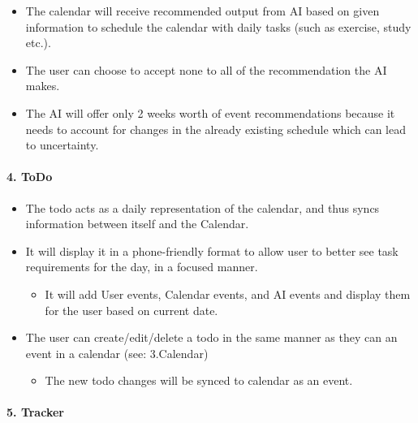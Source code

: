 \documentclass[a4paper,11pt]{article} %
\begin{document}
\begin{itemize}
  \begin{itemize}
   
  \item
    The calendar will receive recommended output from AI based on given
    information to schedule the calendar with daily tasks (such as
    exercise, study etc.).
  \item
    The user can choose to accept none to all of the recommendation the
    AI makes.
  \item
    The AI will offer only 2 weeks worth of event recommendations
    because it needs to account for changes in the already existing
    schedule which can lead to uncertainty.
  \end{itemize}
\end{itemize}

\hypertarget{todo}{%
\paragraph{4. ToDo}\label{todo}}

\begin{itemize}
 
\item
  The todo acts as a daily representation of the calendar, and thus
  syncs information between itself and the Calendar.
\item
  It will display it in a phone-friendly format to allow user to better
  see task requirements for the day, in a focused manner.

  \begin{itemize}
   
  \item
    It will add User events, Calendar events, and AI events and display
    them for the user based on current date.
  \end{itemize}
\item
  The user can create/edit/delete a todo in the same manner as they can
  an event in a calendar (see: 3.Calendar)

  \begin{itemize}
   
  \item
    The new todo changes will be synced to calendar as an event.
  \end{itemize}
\end{itemize}

\hypertarget{tracker}{%
\paragraph{5. Tracker}\label{tracker}}
\end{document}
